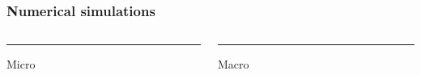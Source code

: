 \documentclass[10pt]{beamer}
\begin{document}
\begin{frame}
\frametitle{Numerical simulations}
\begin{columns}[T] %
	\begin{column}{.48\textwidth}
		\color{orange}\rule{\linewidth}{4pt}
		
		Micro
	\end{column}%
	\hfill%
	\begin{column}{.48\textwidth}
		\color{blue}\rule{\linewidth}{4pt}
		
		Macro
	\end{column}%
\end{columns}
\end{frame}





\end{document}
